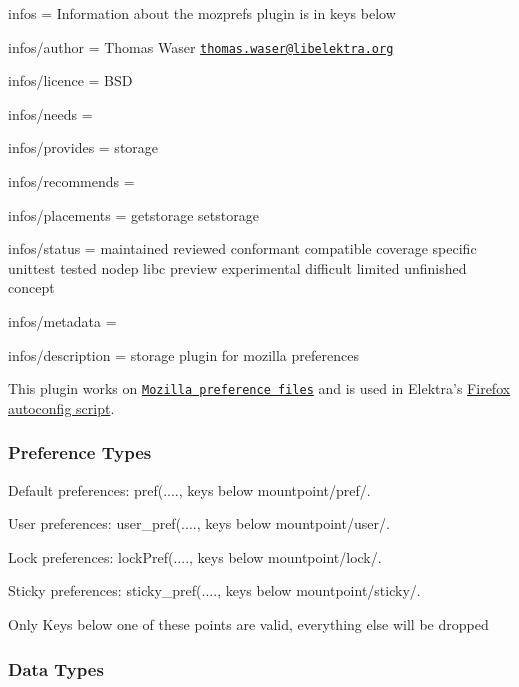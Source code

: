 
\begin{DoxyItemize}
\item infos = Information about the mozprefs plugin is in keys below
\item infos/author = Thomas Waser \href{mailto:thomas.waser@libelektra.org}{\tt thomas.\+waser@libelektra.\+org}
\item infos/licence = B\+SD
\item infos/needs =
\item infos/provides = storage
\item infos/recommends =
\item infos/placements = getstorage setstorage
\item infos/status = maintained reviewed conformant compatible coverage specific unittest tested nodep libc preview experimental difficult limited unfinished concept
\item infos/metadata =
\item infos/description = storage plugin for mozilla preferences
\end{DoxyItemize}

This plugin works on \href{https://developer.mozilla.org/en-US/docs/Mozilla/Preferences/A_brief_guide_to_Mozilla_preferences}{\tt Mozilla preference files} and is used in Elektra’s \hyperlink{md_src_plugins_mozprefs_autoconfig_README_src_plugins_mozprefs_autoconfig_README_md}{Firefox autoconfig script}.

\subsubsection*{Preference Types}


\begin{DoxyItemize}
\item Default preferences\+: {\ttfamily pref(....}, keys below {\ttfamily mountpoint/pref/}.
\item User preferences\+: {\ttfamily user\+\_\+pref(....}, keys below {\ttfamily mountpoint/user/}.
\item Lock preferences\+: {\ttfamily lock\+Pref(....}, keys below {\ttfamily mountpoint/lock/}.
\item Sticky preferences\+: {\ttfamily sticky\+\_\+pref(....}, keys below {\ttfamily mountpoint/sticky/}.
\end{DoxyItemize}

Only Keys below one of these points are valid, everything else will be dropped

\subsubsection*{Data Types}


